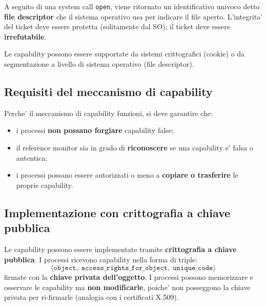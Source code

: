 A seguito di una system call \texttt{open}, viene ritornato un identificativo univoco detto \textbf{file descriptor} che il sistema operativo usa per indicare il file aperto. L'integrita' del ticket deve essere protetta (solitamente dal SO); il ticket deve essere \textbf{irrefutabile}.

Le capability possono essere supportate da sistemi crittografici (cookie) o da segmentazione a livello di sistema operativo (file descriptor).


\subsection{Requisiti del meccanismo di capability}
Perche' il meccanismo di capability funzioni, si deve garantire che:
\begin{itemize}
  \item i processi \textbf{non possano forgiare} capability false;
  \item il reference monitor sia in grado di \textbf{riconoscere} se una capability e' falsa o autentica;
  \item i processi possano essere autorizzati o meno a \textbf{copiare o trasferire} le proprie capability.
\end{itemize}

\subsection{Implementazione con crittografia a chiave pubblica}
Le capability possono essere implementate tramite \textbf{crittografia a chiave pubblica}. I processi ricevono capability nella forma di triple:
\[
  \langle \texttt{object},\; \texttt{access\_rights\_for\_object},\; \texttt{unique\_code} \rangle
\]
firmate con la \textbf{chiave privata dell'oggetto}. I processi possono memorizzare e osservare le capability ma \textbf{non modificarle}, poiche' non posseggono la chiave privata per ri-firmarle (analogia con i certificati X.509).

